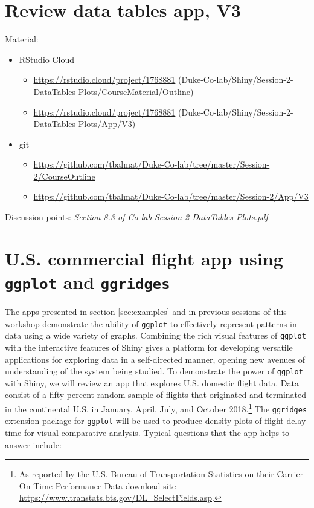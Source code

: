 \documentclass[10pt, letterpaper]{article}
\begin{document}
\begin{spacing}{1.0}

\section{Review data tables app, V3}\label{sec:reviewapp}

Material:
\begin{itemize}
    \item RStudio Cloud
    \begin{itemize}[noitemsep]
      \item \url{https://rstudio.cloud/project/1768881} (Duke-Co-lab/Shiny/Session-2-DataTables-Plots/CourseMaterial/Outline)
      \item \url{https://rstudio.cloud/project/1768881} (Duke-Co-lab/Shiny/Session-2-DataTables-Plots/App/V3)
    \end{itemize}
    \item git
    \begin{itemize}[noitemsep]
      \item \url{https://github.com/tbalmat/Duke-Co-lab/tree/master/Session-2/CourseOutline}
      \item \url{https://github.com/tbalmat/Duke-Co-lab/tree/master/Session-2/App/V3}
    \end{itemize}
\end{itemize}

Discussion points:  \textit{Section 8.3 of Co-lab-Session-2-DataTables-Plots.pdf}


\section{U.S. commercial flight app using \texttt{ggplot} and \texttt{ggridges}}\label{sec:flightapp}

The apps presented in section \ref{sec:examples} and in previous sessions of this workshop demonstrate the ability of \texttt{ggplot} to effectively represent patterns in data using a wide variety of graphs.  Combining the rich visual features of \texttt{ggplot} with the interactive features of Shiny gives a platform for developing versatile applications for exploring data in a self-directed manner, opening new avenues of understanding of the system being studied.  To demonstrate the power of \texttt{ggplot} with Shiny, we will review an app that explores U.S. domestic flight data.  Data consist of a fifty percent random sample of flights that originated and terminated in the continental U.S. in January, April, July, and October 2018.\footnote{As reported by the U.S. Bureau of Transportation Statistics on their Carrier On-Time Performance Data download site \url{https://www.transtats.bts.gov/DL_SelectFields.asp}.}  The \texttt{ggridges} extension package for \texttt{ggplot} will be used to produce density plots of flight delay time for visual comparative analysis.  Typical questions that the app helps to answer include:


\end{spacing}
\end{document}
